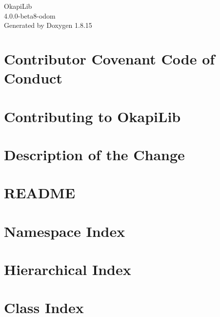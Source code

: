 \let\mypdfximage\pdfximage\def\pdfximage{\immediate\mypdfximage}\documentclass[twoside]{book}
\newcommand{\+}{\discretionary{\mbox{\scriptsize$\hookleftarrow$}}{}{}}
\newcommand{\clearemptydoublepage}{%
  \newpage{\pagestyle{empty}\cleardoublepage}%
}
\begin{document}
\hypersetup{pageanchor=false,
             bookmarksnumbered=true,
             pdfencoding=unicode
            }
\begin{titlepage}
\vspace*{7cm}
\begin{center}%
{\Large Okapi\+Lib \\[1ex]\large 4.\+0.\+0-\/beta8-\/odom }\\
\vspace*{1cm}
{\large Generated by Doxygen 1.8.15}\\
\end{center}
\end{titlepage}
\clearemptydoublepage
{}
\tableofcontents
\clearemptydoublepage
{}
\hypersetup{pageanchor=true}

\chapter{Contributor Covenant Code of Conduct}
\label{md_code-of-conduct}

\chapter{Contributing to Okapi\+Lib}
\label{md_CONTRIBUTING}

\chapter{Description of the Change}
\label{md_PULL_REQUEST_TEMPLATE}

\chapter{R\+E\+A\+D\+ME}
\label{md_README}

\chapter{Namespace Index}

\chapter{Hierarchical Index}

\chapter{Class Index}

\end{document}

